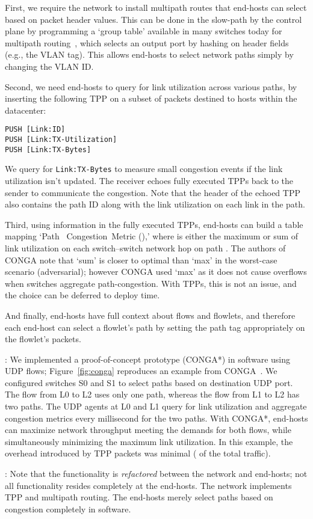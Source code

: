 \begin{ecam}
First, we require the network to install multipath routes that
end-hosts can select based on packet header values.  This can be done in
the slow-path by the control plane by programming a `group table' available
in many switches today for multipath routing~\cite[\S5.6.1]{of1.4}, which
selects an output port by hashing on header fields (e.g., the VLAN tag).
This allows end-hosts to select network paths simply by changing the VLAN ID.

Second, we need end-hosts to query for link utilization across various paths,
by inserting the following TPP on a subset of packets destined to hosts
within the datacenter:
\begin{verbatim}
PUSH [Link:ID]
PUSH [Link:TX-Utilization]
PUSH [Link:TX-Bytes]
\end{verbatim}

We query for {\tt Link:TX-Bytes} to measure small
congestion events if the link utilization isn't updated.  The receiver echoes
fully executed TPPs back to the
sender to communicate the congestion.  Note that the header of the echoed TPP
also contains the path ID along with the link utilization on each link in the path.

Third, using information in the fully executed TPPs, end-hosts can build a
table mapping `Path~ Congestion~Metric (),' where 
is either the maximum or sum of link utilization on each switch--switch
network hop on path .  The authors of CONGA note that `sum' is closer to
optimal than `max' in the worst-case scenario (adversarial);
however CONGA used `max' as it does not cause overflows when switches aggregate
path-congestion.  With TPPs, this is not an issue, and the choice can be deferred
to deploy time.

And finally, end-hosts have full context about flows and flowlets, and
therefore each end-host can select a flowlet's path by setting the
path tag appropriately on the flowlet's packets.

:  We implemented a proof-of-concept prototype (CONGA*) in software using UDP flows;
Figure~\ref{fig:conga} reproduces an example from CONGA~\cite[Figure~4]{conga}.
We configured switches S0 and S1 to select paths based on destination UDP
port.  The flow from L0 to L2 uses only one path, whereas the
flow from L1 to L2 has two paths.  The UDP agents at L0 and L1 query
for link utilization and aggregate congestion metrics every millisecond
for the two paths.  With CONGA*, end-hosts can maximize network
throughput meeting the demands for both flows, while simultaneously minimizing
the maximum link utilization.  In this example, the overhead introduced by
TPP packets was minimal ( of the total traffic).

: Note that the functionality is \emph{refactored}
between the network and end-hosts; not all functionality resides completely
 at the end-hosts.  The network implements TPP and multipath
routing.  The end-hosts merely select paths based on congestion completely
in software.
\end{ecam}


